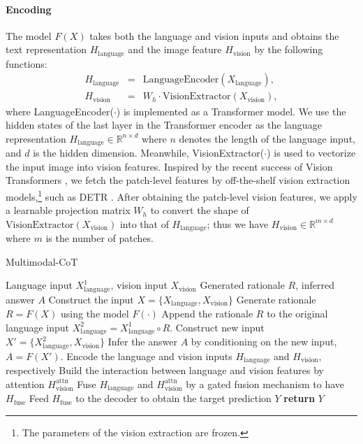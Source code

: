\documentclass[nohyperref]{article}
\theoremstyle{plain}
\theoremstyle{definition}
\theoremstyle{remark}
\begin{document}
\paragraph{Encoding} The model $F(X)$ takes both the language and vision inputs and obtains the text representation $H_{\textrm{language}}$ and the image feature $H_{\textrm{vision}}$ by the following functions:
\begin{eqnarray}
	H_{\textrm{language}} & = & \textrm{LanguageEncoder}(X_{\textrm{language}}), \\
	H_{\textrm{vision}}  & = & W_{h} \cdot \textrm{VisionExtractor}(X_{\textrm{vision}}),
	\label{eq:extractor}
\end{eqnarray}
where \textrm{LanguageEncoder}($\cdot$) is implemented as a Transformer model. We use the hidden states of the last layer in the Transformer encoder as the language representation $H_{\textrm{language}} \in \mathbb{R}^{n \times d}$ where $n$ denotes the length of the language input, and $d$ is the hidden dimension.
Meanwhile, \textrm{VisionExtractor}($\cdot$) is used to vectorize the input image into vision features. Inspired by the recent success of Vision Transformers \citep{dosovitskiy2020image}, we fetch the patch-level features by off-the-shelf vision extraction models,\footnote{{The parameters of the vision extraction are frozen.}} such as DETR \citep{carion2020end}. After obtaining the patch-level vision features, we apply a learnable projection matrix $W_{h}$ to convert the shape of $\textrm{VisionExtractor}(X_{\textrm{vision}})$ into that of $H_{\textrm{language}}$; thus we have $H_{\textrm{vision}} \in \mathbb{R}^{m \times d}$ where $m$ is the number of patches.

\begin{algorithm}[t]\small
    \caption{Multimodal-CoT}\label{alg:mm-cot}
    \begin{algorithmic}[1]
    \Require Language input $X_{\textrm{language}}^{1}$, vision input $X_{\textrm{vision}}$
    \Ensure Generated rationale $R$, inferred answer $A$
    \State Construct the input $X=\{X_{\textrm{language}}, X_{\textrm{vision}}\}$
    \State Generate rationale ${R} = F(X)$ using the model $F(\cdot)$
\State Append the rationale $R$ to the original language input $X_{\textrm{language}}^{2} = X_{\textrm{language}}^{1} \circ {R}$.
    \State Construct new input $X'=\{X_{\textrm{language}}^{2}, X_{\textrm{vision}}\}$
    \State Infer the answer $A$ by conditioning on the new input, ${A} = F(X')$. 
    \State Encode the language and vision inputs $H_{\textrm{language}}$ and $H_{\textrm{vision}}$, respectively 
    \State Build the interaction between language and vision features by attention $H_{\textrm{vision}}^\textrm{attn}$
    \State Fuse $H_{\textrm{language}}$ and $H_{\textrm{vision}}^\textrm{attn}$ by a gated fusion mechanism to have $H_{\textrm{fuse}}$
    \State Feed $H_{\textrm{fuse}}$ to the decoder to obtain the target prediction $Y$
    \State \textbf{return} $Y$
    \EndProcedure \end{algorithmic}
    
\end{algorithm}
%
 
\end{document}
